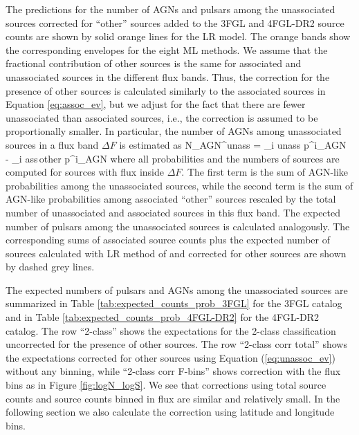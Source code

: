 The predictions for the number of AGNs and pulsars among the unassociated sources corrected for ``other'' sources 
added to the 3FGL and 4FGL-DR2  source counts are shown by solid orange lines for the LR model.
The orange bands show the corresponding envelopes for the eight ML methods.
We assume that the fractional contribution of other sources is the same for associated and unassociated sources in the different flux bands.
Thus, the correction for the presence of other sources is calculated similarly to the associated sources in Equation \ref{eq:assoc_ev},
but we adjust for the fact that there are fewer unassociated than associated sources, i.e., 
the correction is assumed to be proportionally smaller.
In particular, the number of AGNs among unassociated sources in a flux band $\Delta F$ is estimated as
\be
{}
N_{\rm AGN}^{\rm unass} = \sum_{i \in \rm unass} p^i_{\rm AGN}\,\, - \sum_{i \in \rm ass\,other} p^i_{\rm AGN} \cdot 
{}
\ee
where all probabilities and the numbers of sources are computed for sources with flux inside $\Delta F$.
The first term is the sum of AGN-like probabilities among the unassociated sources,
while the second term is the sum of AGN-like probabilities among associated ``other'' sources rescaled by the total number
of unassociated and associated sources in this flux band.
The expected number of pulsars among the unassociated sources is calculated analogously.
The corresponding sums of associated source counts plus the expected number of sources calculated with LR method of \cite{2016ApJ...820....8S} 
and corrected for other sources are shown by dashed grey lines.


The expected numbers of pulsars and AGNs among the unassociated sources
are summarized in Table \ref{tab:expected_counts_prob_3FGL} for the 3FGL catalog and 
in Table \ref{tab:expected_counts_prob_4FGL-DR2} for the 4FGL-DR2 catalog.
The row ``2-class'' shows the expectations for the 2-class classification uncorrected for the presence of other sources.
The row ``2-class corr total'' shows the expectations corrected for other sources using Equation (\ref{eq:unassoc_ev}) without any binning,
while ``2-class corr F-bins'' shows correction with the flux bins as in Figure \ref{fig:logN_logS}.
We see that corrections using total source counts and source counts binned in flux are similar and relatively small.
In the following section we also calculate the correction using latitude and longitude bins.


